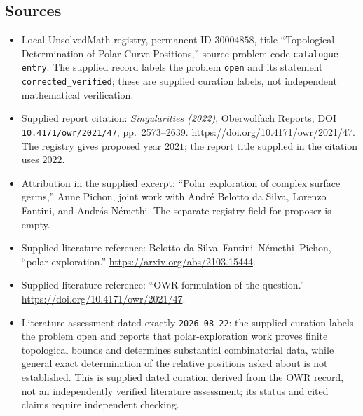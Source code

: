 \documentclass[11pt]{article}
\begin{document}
\subsection{Sources}
\begin{itemize}
\item Local UnsolvedMath registry, permanent ID \(30004858\), title ``Topological Determination of Polar Curve Positions,'' source problem code \texttt{catalogue entry}. The supplied record labels the problem \texttt{open} and its statement \texttt{corrected\_verified}; these are supplied curation labels, not independent mathematical verification.
\item Supplied report citation: \emph{Singularities (2022)}, Oberwolfach Reports, DOI \texttt{10.4171/owr/2021/47}, pp.\ 2573--2639. \url{https://doi.org/10.4171/owr/2021/47}. The registry gives proposed year \(2021\); the report title supplied in the citation uses \(2022\).
\item Attribution in the supplied excerpt: ``Polar exploration of complex surface germs,'' Anne Pichon, joint work with André Belotto da Silva, Lorenzo Fantini, and András Némethi. The separate registry field for proposer is empty.
\item Supplied literature reference: Belotto da Silva--Fantini--Némethi--Pichon, ``polar exploration.'' \url{https://arxiv.org/abs/2103.15444}.
\item Supplied literature reference: ``OWR formulation of the question.'' \url{https://doi.org/10.4171/owr/2021/47}.
\item Literature assessment dated exactly \texttt{2026-08-22}: the supplied curation labels the problem open and reports that polar-exploration work proves finite topological bounds and determines substantial combinatorial data, while general exact determination of the relative positions asked about is not established. This is supplied dated curation derived from the OWR record, not an independently verified literature assessment; its status and cited claims require independent checking.
\end{itemize}
\end{document}
